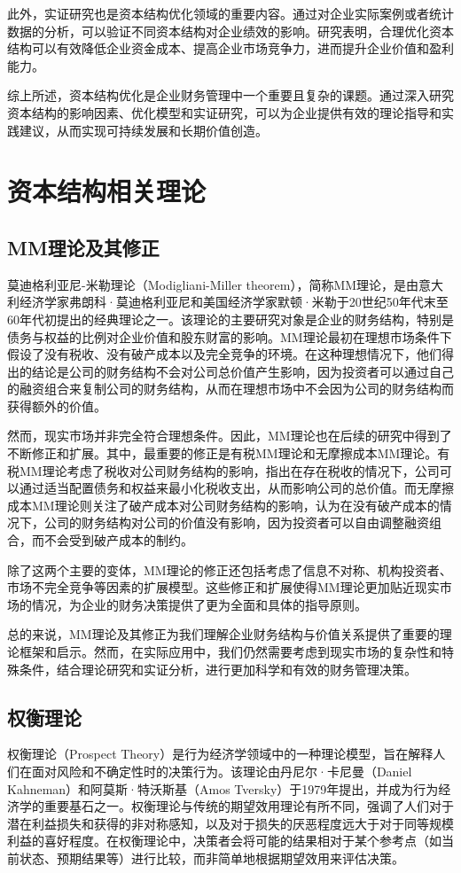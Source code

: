 此外，实证研究也是资本结构优化领域的重要内容。通过对企业实际案例或者统计数据的分析，可以验证不同资本结构对企业绩效的影响。研究表明，合理优化资本结构可以有效降低企业资金成本、提高企业市场竞争力，进而提升企业价值和盈利能力。

综上所述，资本结构优化是企业财务管理中一个重要且复杂的课题。通过深入研究资本结构的影响因素、优化模型和实证研究，可以为企业提供有效的理论指导和实践建议，从而实现可持续发展和长期价值创造。
\section{资本结构相关理论}
\subsection{MM理论及其修正}
莫迪格利亚尼-米勒理论（Modigliani-Miller theorem），简称MM理论，是由意大利经济学家弗朗科·莫迪格利亚尼和美国经济学家默顿·米勒于20世纪50年代末至60年代初提出的经典理论之一。\cite{Modigliani1958}该理论的主要研究对象是企业的财务结构，特别是债务与权益的比例对企业价值和股东财富的影响。MM理论最初在理想市场条件下假设了没有税收、没有破产成本以及完全竞争的环境。在这种理想情况下，他们得出的结论是公司的财务结构不会对公司总价值产生影响，因为投资者可以通过自己的融资组合来复制公司的财务结构，从而在理想市场中不会因为公司的财务结构而获得额外的价值。

然而，现实市场并非完全符合理想条件。因此，MM理论也在后续的研究中得到了不断修正和扩展。其中，最重要的修正是有税MM理论和无摩擦成本MM理论。有税MM理论考虑了税收对公司财务结构的影响，指出在存在税收的情况下，公司可以通过适当配置债务和权益来最小化税收支出，从而影响公司的总价值。而无摩擦成本MM理论则关注了破产成本对公司财务结构的影响，认为在没有破产成本的情况下，公司的财务结构对公司的价值没有影响，因为投资者可以自由调整融资组合，而不会受到破产成本的制约。

除了这两个主要的变体，MM理论的修正还包括考虑了信息不对称、机构投资者、市场不完全竞争等因素的扩展模型。这些修正和扩展使得MM理论更加贴近现实市场的情况，为企业的财务决策提供了更为全面和具体的指导原则。

总的来说，MM理论及其修正为我们理解企业财务结构与价值关系提供了重要的理论框架和启示。然而，在实际应用中，我们仍然需要考虑到现实市场的复杂性和特殊条件，结合理论研究和实证分析，进行更加科学和有效的财务管理决策。
\subsection{权衡理论}
权衡理论（Prospect Theory）是行为经济学领域中的一种理论模型，旨在解释人们在面对风险和不确定性时的决策行为。该理论由丹尼尔·卡尼曼（Daniel Kahneman）和阿莫斯·特沃斯基（Amos Tversky）于1979年提出，并成为行为经济学的重要基石之一。权衡理论与传统的期望效用理论有所不同，强调了人们对于潜在利益损失和获得的非对称感知，以及对于损失的厌恶程度远大于对于同等规模利益的喜好程度。在权衡理论中，决策者会将可能的结果相对于某个参考点（如当前状态、预期结果等）进行比较，而非简单地根据期望效用来评估决策。

